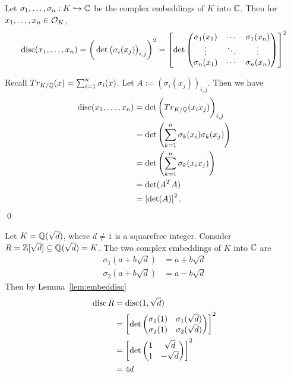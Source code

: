 \begin{lem} \label{lem:embeddisc}
Let $\sigma_1, \ldots, \sigma_n: K \hookrightarrow \mathbb{C}$ be the complex embeddings of $K$ into $\mathbb{C}$. Then for $x_1, \ldots, x_n \in \mathcal{O}_K$,
	\[
	\operatorname{disc}(x_1, \ldots, x_n)= \bigg( \det \big(\sigma_i(x_j) \big)_{i,j} \bigg)^2= \left[ \det 
	\begin{pmatrix}
	\sigma_1(x_1) & \cdots & \sigma_1(x_n) \\
	\vdots & \ddots & \vdots \\
	\sigma_n(x_1) & \cdots & \sigma_n(x_n)
	\end{pmatrix} \right]^2
	\]
\end{lem}

\pf Recall $Tr_{K/\mathbb{Q}}(x)= \sum_{i=1}^n \sigma_i(x)$. Let $A:= (\sigma_i(x_j))_{i,j}$. Then we have
	\[
	\begin{split}
	\operatorname{disc}(x_1, \ldots, x_n)&= \det \bigg( Tr_{K/\mathbb{Q}}(x_ix_j) \bigg)_{i,j} \\
	&=\det \left( \sum_{k=1}^n \sigma_k(x_i) \sigma_k(x_j) \right) \\
	&=\det \left( \sum_{k=1}^n \sigma_k(x_i x_j) \right) \\
	&= \det( A^TA) \\
	&= \left[ \det(A) \right]^2.
	\end{split}
	\] \qed \pskip


\begin{ex}
Let $K= \mathbb{Q}(\sqrt{d})$, where $d \neq 1$ is a squarefree integer. Consider $R= \mathbb{Z}[\sqrt{d}] \subseteq \mathbb{Q}(\sqrt{d})= K$. The two complex embeddings of $K$ into $\mathbb{C}$ are 
	\[
	\begin{split}
	\sigma_1(a + b\sqrt{d})&= a + b\sqrt{d} \\
	\sigma_2(a + b\sqrt{d})&= a - b\sqrt{d}
	\end{split}
	\]
Then by Lemma~\ref{lem:embeddisc}
	\[
	\begin{split}
	\operatorname{disc} R&= \operatorname{disc}(1,\sqrt{d}) \\
	&= \left[ \det \begin{pmatrix}
	\sigma_1(1) & \sigma_1(\sqrt{d}) \\
	\sigma_2(1) & \sigma_2(\sqrt{d})
	\end{pmatrix} \right]^2 \\
	&= \left[\det \begin{pmatrix}
	1 & \sqrt{d} \\
	1 & -\sqrt{d}
	\end{pmatrix} \right]^2 \\
	&= 4d
	\end{split}
	\] \xqed \pskip
\end{ex}



